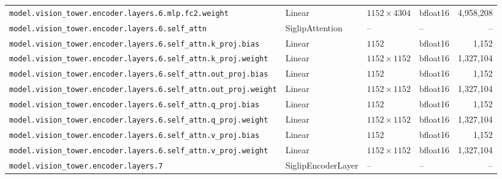 \documentclass[10pt,a4paper]{article}
\theoremstyle{definition}
\begin{document}
\begin{appendices}
{\begin{longtable}{p{6.8cm}>{\raggedright\arraybackslash}p{3.3cm}llr}
\texttt{model.\allowbreak{}vision\_tower.\allowbreak{}encoder.\allowbreak{}layers.\allowbreak{}6.\allowbreak{}mlp.\allowbreak{}fc2.\allowbreak{}weight} & Linear & $1152 \times 4304$ & bfloat16 & 4,958,208 \\
\texttt{model.\allowbreak{}vision\_tower.\allowbreak{}encoder.\allowbreak{}layers.\allowbreak{}6.\allowbreak{}self\_attn} & Siglip\allowbreak{}Attention & -- & -- & -- \\
\texttt{model.\allowbreak{}vision\_tower.\allowbreak{}encoder.\allowbreak{}layers.\allowbreak{}6.\allowbreak{}self\_attn.\allowbreak{}k\_proj.\allowbreak{}bias} & Linear & $1152$ & bfloat16 & 1,152 \\
\texttt{model.\allowbreak{}vision\_tower.\allowbreak{}encoder.\allowbreak{}layers.\allowbreak{}6.\allowbreak{}self\_attn.\allowbreak{}k\_proj.\allowbreak{}weight} & Linear & $1152 \times 1152$ & bfloat16 & 1,327,104 \\
\texttt{model.\allowbreak{}vision\_tower.\allowbreak{}encoder.\allowbreak{}layers.\allowbreak{}6.\allowbreak{}self\_attn.\allowbreak{}out\_proj.\allowbreak{}bias} & Linear & $1152$ & bfloat16 & 1,152 \\
\texttt{model.\allowbreak{}vision\_tower.\allowbreak{}encoder.\allowbreak{}layers.\allowbreak{}6.\allowbreak{}self\_attn.\allowbreak{}out\_proj.\allowbreak{}weight} & Linear & $1152 \times 1152$ & bfloat16 & 1,327,104 \\
\texttt{model.\allowbreak{}vision\_tower.\allowbreak{}encoder.\allowbreak{}layers.\allowbreak{}6.\allowbreak{}self\_attn.\allowbreak{}q\_proj.\allowbreak{}bias} & Linear & $1152$ & bfloat16 & 1,152 \\
\texttt{model.\allowbreak{}vision\_tower.\allowbreak{}encoder.\allowbreak{}layers.\allowbreak{}6.\allowbreak{}self\_attn.\allowbreak{}q\_proj.\allowbreak{}weight} & Linear & $1152 \times 1152$ & bfloat16 & 1,327,104 \\
\texttt{model.\allowbreak{}vision\_tower.\allowbreak{}encoder.\allowbreak{}layers.\allowbreak{}6.\allowbreak{}self\_attn.\allowbreak{}v\_proj.\allowbreak{}bias} & Linear & $1152$ & bfloat16 & 1,152 \\
\texttt{model.\allowbreak{}vision\_tower.\allowbreak{}encoder.\allowbreak{}layers.\allowbreak{}6.\allowbreak{}self\_attn.\allowbreak{}v\_proj.\allowbreak{}weight} & Linear & $1152 \times 1152$ & bfloat16 & 1,327,104 \\
\texttt{model.\allowbreak{}vision\_tower.\allowbreak{}encoder.\allowbreak{}layers.\allowbreak{}7} & Siglip\allowbreak{}Encoder\allowbreak{}Layer & -- & -- & -- \\

\end{longtable}}
\end{appendices}
\end{document}

